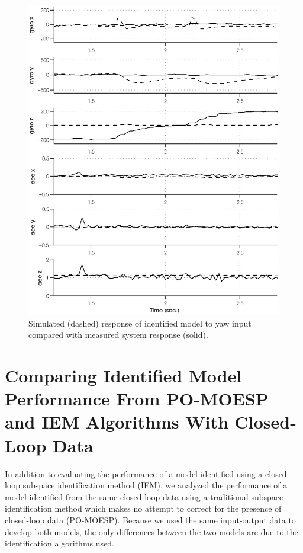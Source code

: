 \newpage
\begin{figure}[htb!]
	\centering
	\includegraphics{../fig/sim_1760_yaw.eps}
	\caption{Simulated (dashed) response of identified model to yaw input compared with measured system response (solid).}
	\label{sim_1760_yaw}
\end{figure}\clearpage


\newpage
\section{Comparing Identified Model Performance From PO-MOESP and IEM Algorithms With Closed-Loop Data}
In addition to evaluating the performance of a model identified using a closed-loop subspace identification method (IEM), we analyzed the performance of a model identified from the same closed-loop data using a traditional subspace identification method which makes no attempt to correct for the presence of closed-loop data (PO-MOESP). Because we used the same input-output data to develop both models, the only differences between the two models are due to the identification algorithms used. 

